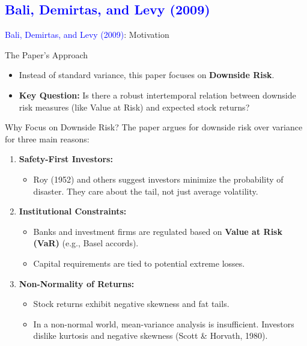 \documentclass{beamer}
\begin{document}
\subsection{\textcolor{blue}{Bali, Demirtas, and Levy (2009)}}
\begin{frame}{\textcolor{blue}{Bali, Demirtas, and Levy (2009)}: Motivation}

    \begin{block}{The Paper's Approach}
        \begin{itemize}
            \item Instead of standard variance, this paper focuses on \textbf{Downside Risk}.
            \item \textbf{Key Question:} Is there a robust intertemporal relation between downside risk measures (like Value at Risk) and expected stock returns?
        \end{itemize}
    \end{block}
\end{frame}

\begin{frame}{Why Focus on Downside Risk?}
    The paper argues for downside risk over variance for three main reasons:

    \begin{enumerate}
        \item \textbf{Safety-First Investors:} 
            \begin{itemize}
                \item Roy (1952) and others suggest investors minimize the probability of disaster. They care about the tail, not just average volatility.
            \end{itemize}
        
        \item \textbf{Institutional Constraints:}
            \begin{itemize}
                \item Banks and investment firms are regulated based on \textbf{Value at Risk (VaR)} (e.g., Basel accords). 
                \item Capital requirements are tied to potential extreme losses.
            \end{itemize}
            
        \item \textbf{Non-Normality of Returns:}
            \begin{itemize}
                \item Stock returns exhibit negative skewness and fat tails.
                \item In a non-normal world, mean-variance analysis is insufficient. Investors dislike kurtosis and negative skewness (Scott \& Horvath, 1980).
            \end{itemize}
    \end{enumerate}
\end{frame}
\end{document}
